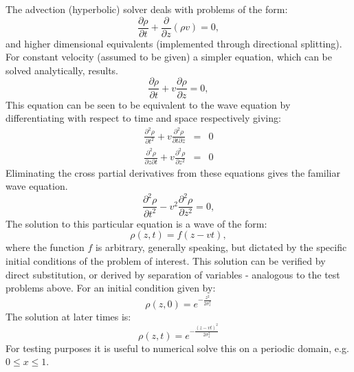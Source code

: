 \documentclass[11pt,letterpaper]{article}
\begin{document}
The advection (hyperbolic) solver deals with problems of the form:
\begin{equation}
\frac{\partial \rho}{\partial t} + \frac{\partial}{\partial z} \left( \rho v \right) = 0,  
\end{equation}
and higher dimensional equivalents (implemented through directional splitting).  For constant velocity (assumed to be given) a simpler equation, which can be solved analytically, results.  
\begin{equation}
\frac{\partial \rho}{\partial t} + v \frac{\partial \rho}{\partial z} = 0,  
\end{equation}
This equation can be seen to be equivalent to the wave equation by differentiating with respect to time and space respectively giving:  
\begin{eqnarray}
\frac{\partial^2 \rho}{\partial t^2} + v \frac{\partial^2 \rho}{\partial t \partial z} &=& 0 \\
\frac{\partial^2 \rho}{\partial z \partial t} + v \frac{\partial^2 \rho}{\partial z^2} &=& 0
\end{eqnarray}
Eliminating the cross partial derivatives from these equations gives the familiar wave equation.  
\begin{equation}
\frac{\partial^2 \rho}{\partial t^2} - v^2 \frac{\partial^2 \rho}{\partial z^2} = 0,  
\end{equation}
The solution to this particular equation is a wave of the form:
\begin{equation}
\rho(z,t)=f(z-vt),
\end{equation}
where the function $f$ is arbitrary, generally speaking, but dictated by the specific initial conditions of the problem of interest.  This solution can be verified by direct substitution, or derived by separation of variables - analogous to the test problems above.  For an initial condition given by:
\begin{equation}
\rho(z,0)=e^{-\frac{z^2}{2 \sigma_z^2}}
\end{equation}
The solution at later times is:
\begin{equation}
\rho(z,t)=e^{-\frac{(z-vt)^2}{2 \sigma_z^2}}
\end{equation}
For testing purposes it is useful to numerical solve this on a periodic domain, e.g. $0 \le x \le 1$.
\end{document}

